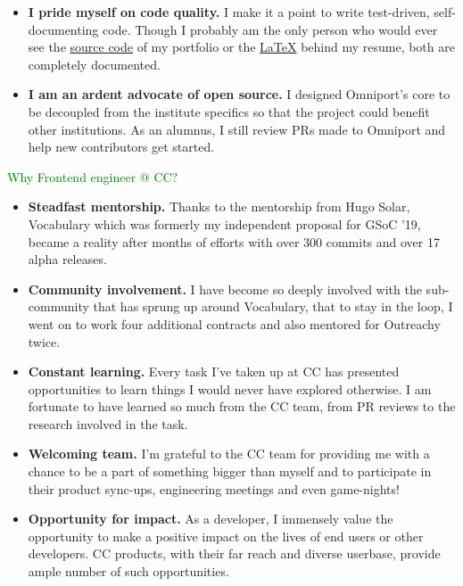 \begin{itemize}[nosep, parsep=1mm, leftmargin=*]
  \item \textbf{I pride myself on code quality.} I make it a point to write
  test-driven, self-documenting code. Though I probably am the only person who
  would ever see the \href{https://github.com/dhruvkb/portfolio/}{source code}
  of my portfolio or the
  \href{https://github.com/dhruvkb/resume/}{\selectfont\LaTeX}
  behind my resume, both are completely documented.

  \item \textbf{I am an ardent advocate of open source.} I designed Omniport's
  core to be decoupled from the institute specifics so that the project could
  benefit other institutions. As an alumnus, I still review PRs made to Omniport
  and help new contributors get started.
\end{itemize}

\textcolor{green}{Why Frontend engineer @ CC?} 
\begin{itemize}[nosep, parsep=1mm, leftmargin=*]
  \item \textbf{Steadfast mentorship.} Thanks to the mentorship from Hugo Solar,
  Vocabulary which was formerly my independent proposal for GSoC '19, became a
  reality after months of efforts with over 300 commits and over 17 alpha
  releases.

  \item \textbf{Community involvement.} I have become so deeply involved with
  the sub-community that has sprung up around Vocabulary, that to stay in the
  loop, I went on to work four additional contracts and also mentored for
  Outreachy twice.

  \item \textbf{Constant learning.} Every task I've taken up at CC has presented
  opportunities to learn things I would never have explored otherwise. I am
  fortunate to have learned so much from the CC team, from PR reviews to the
  research involved in the task.

  \item \textbf{Welcoming team.} I'm grateful to the CC team for providing me
  with a chance to be a part of something bigger than myself and to participate
  in their product sync-ups, engineering meetings and even game-nights!

  \item \textbf{Opportunity for impact.} As a developer, I immensely value the
  opportunity to make a positive impact on the lives of end users or other
  developers. CC products, with their far reach and diverse userbase, provide
  ample number of such opportunities.
\end{itemize}

